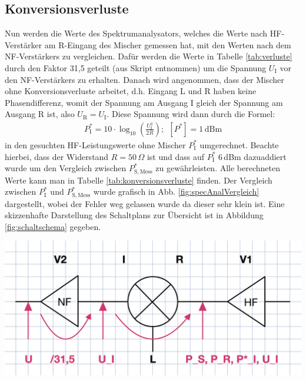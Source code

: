 \subsection{Konversionsverluste}
\label{sub:konversionsverluste}

Nun werden die Werte des Spektrumanalysators, welches die Werte nach HF-Verstärker am R-Eingang des Mischer gemessen hat, mit den Werten nach dem NF-Verstärkers zu vergleichen. Dafür werden die Werte in Tabelle \ref{tab:verluste} durch den Faktor 31,5 geteilt (aus Skript entnommen) um die Spannung $U_\mathrm{I}$ vor den NF-Verstärkers zu erhalten. Danach wird angenommen, dass der Mischer ohne Konversionsverluste arbeitet, d.h. Eingang L und R haben keine Phasendifferenz, womit der Spannung am Ausgang I gleich der Spannung am Ausgang R ist, also $U_\mathrm{R} = U_\mathrm{I}$. Diese Spannung wird dann durch die Formel:
\begin{gather}
    P^*_\mathrm{I} = 10\cdot\log_{10}\left(\frac{U_\mathrm{I}^2}{2R}\right);~~[P^*] = 1\,\mathrm{dBm}
\end{gather}
in den gesuchten HF-Leistungswerte ohne Mischer $P_\mathrm{I}^*$ umgerechnet. \cite{anleitung} Beachte hierbei, dass der Widerstand $R=50\,\Omega$ \cite{anleitung} ist und dass auf $P_\mathrm{I}^*$ 6\,dBm dazuaddiert wurde um den Vergleich zwischen $P_\mathrm{S,Mess}^*$ zu gewährleisten. Alle berechneten Werte kann man in Tabelle \ref{tab:konversionsverluste} finden. Der Vergleich zwischen $P^*_\mathrm{I}$ und $P^*_\mathrm{S,Mess}$ wurde grafisch in Abb. \ref{fig:specAnalVergleich} dargestellt, wobei der Fehler weg gelassen wurde da dieser sehr klein ist. Eine skizzenhafte Darstellung des Schaltplans zur Übersicht ist in Abbildung \ref{fig:schaltschema} gegeben. 

\begin{center}
    \captionsetup{type=figure}
    \includegraphics[scale=0.2]{Bilder/Schaltschema.png}
    \label{fig:schaltschema}
\end{center}

